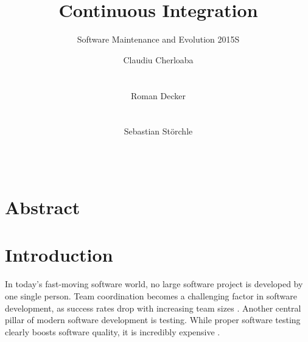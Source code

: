 \documentclass{sig-alternate}
\begin{document}
\title{Continuous Integration}
\subtitle{Software Maintenance and Evolution 2015S}



\author{
\alignauthor
Claudiu Cherloaba\\
       \\
       \\
\alignauthor
Roman Decker\\
       \\
       \\
\alignauthor
Sebastian Störchle\\
       \\
       \\
}

\maketitle

\section{Abstract}\label{sec:abstract}

\section{Introduction}\label{sec:introduction}

In today's fast-moving software world, no large software project is developed by
one single person. Team coordination becomes a challenging factor in software
development, as success rates drop with increasing team sizes
\cite{ambler:2010}. Another central pillar of modern software development is
testing. While proper software testing clearly boosts software quality, it is
incredibly expensive \cite{dustin:1999}.\\
\end{document}
